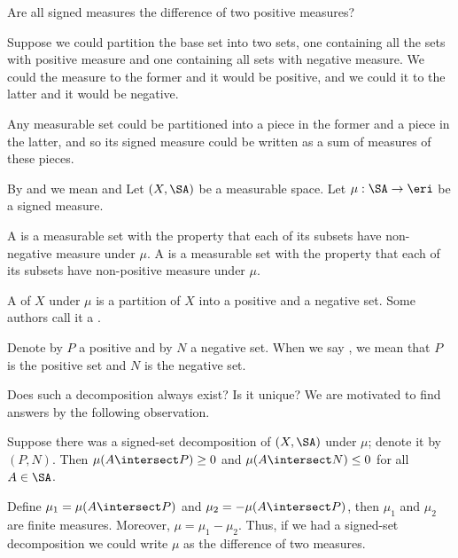 
\sbasic



\sstart



Are all signed measures
the difference of two
positive measures?

Suppose we could partition
the base set into two
sets, one containing
all the sets with positive
measure and one containing
all sets with negative measure.
We could
 the measure to
the former and it would
be positive, and we could
 it to the latter
and it would be negative.

Any measurable set could be partitioned
into a piece in the former and a
piece in the latter, and so
its signed measure could be
written as a sum of measures
of these pieces.


By  and
we mean 
and 
Let $(X, \SA)$ be
a measurable space.
Let $\mu: \SA \to \eri$
be a signed measure.

A 
is a measurable set
with the property that
each of its subsets have
non-negative measure
under $\mu$.
A 
is a measurable set
with the property that
each of its subsets have
non-positive measure
under $\mu$.

A 
of $X$ under $\mu$
is a partition of $X$
into a positive and a negative set.
Some authors call it a
.


Denote by $P$ a positive
and by $N$ a negative set.
When we say ,
we mean that $P$ is
the positive set and $N$
is the negative set.


Does such a decomposition
always exist? Is it unique?
We are motivated to find
answers
by the following observation.

Suppose there was a signed-set
decomposition of $(X, \SA)$
under $\mu$; denote it by $(P, N)$.
Then
$\mu(A \intersect P) \geq 0$
and $\mu(A \intersect N) \leq 0$
for all $A \in \SA$.

Define
$\mu_1 = \mu(A \intersect P)$
and $\mu_2 = -\mu(A \intersect P)$,
then $\mu_1$ and $\mu_2$ are finite measures.
Moreover, $\mu = \mu_1 - \mu_2$.
Thus, if we had a signed-set decomposition
we could write $\mu$ as the difference
of two measures.



\strats

